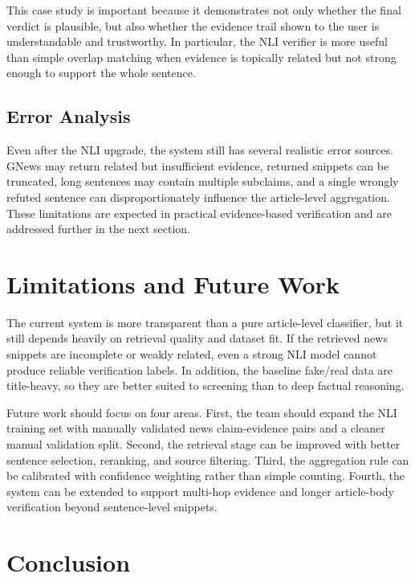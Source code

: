 \documentclass[11pt]{article}
\begin{document}
\FloatBarrier

This case study is important because it demonstrates not only whether the final
verdict is plausible, but also whether the evidence trail shown to the user is
understandable and trustworthy. In particular, the NLI verifier is more useful
than simple overlap matching when evidence is topically related but not strong
enough to support the whole sentence.

\subsection{Error Analysis}

Even after the NLI upgrade, the system still has several realistic error
sources. GNews may return related but insufficient evidence, returned snippets
can be truncated, long sentences may contain multiple subclaims, and a single
wrongly refuted sentence can disproportionately influence the article-level
aggregation. These limitations are expected in practical evidence-based
verification and are addressed further in the next section.

\section{Limitations and Future Work}

The current system is more transparent than a pure article-level classifier, but
it still depends heavily on retrieval quality and dataset fit. If the retrieved
news snippets are incomplete or weakly related, even a strong NLI model cannot
produce reliable verification labels. In addition, the baseline fake/real data
are title-heavy, so they are better suited to screening than to deep factual
reasoning.

Future work should focus on four areas. First, the team should expand the NLI
training set with manually validated news claim-evidence pairs and a cleaner
manual validation split. Second, the retrieval stage can be improved with better
sentence selection, reranking, and source filtering. Third, the aggregation rule
can be calibrated with confidence weighting rather than simple counting. Fourth,
the system can be extended to support multi-hop evidence and longer article-body
verification beyond sentence-level snippets.

\section{Conclusion}
\end{document}
